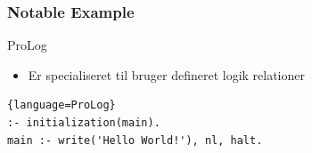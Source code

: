 \documentclass[12pt,t]{beamer}
\begin{document}
\begin{frame}[fragile]
\frametitle{Notable Example}
\begin{block}{ProLog}
\begin{itemize}
\item Er specialiseret til bruger defineret logik relationer
\end{itemize}
\end{block}
\begin{lstlisting}{language=ProLog}
:- initialization(main).
main :- write('Hello World!'), nl, halt.
\end{lstlisting}
\end{frame}







\end{document}
